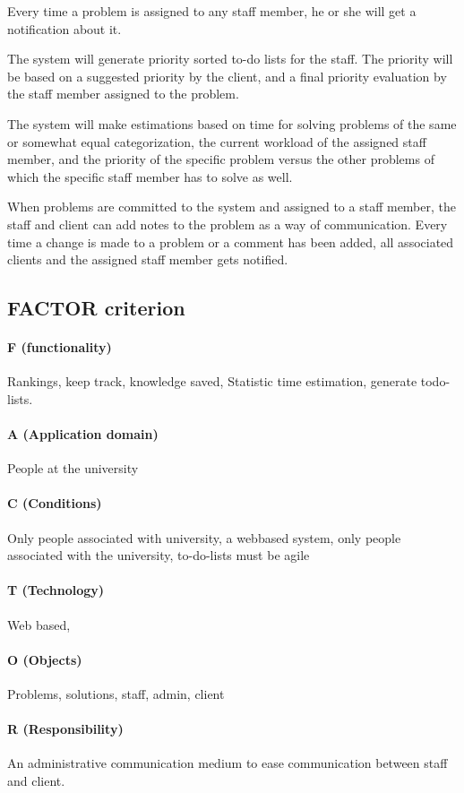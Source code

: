 Every time a problem is assigned to any staff member, he or she will get a notification about it.

The system will generate priority sorted to-do lists for the staff. The priority will be based on a suggested priority by the client, and a final priority evaluation by the staff member assigned to the problem.

The system will make estimations based on time for solving problems of the same or somewhat equal categorization, the current workload of the assigned staff member, and the priority of the specific problem versus the other problems of which the specific staff member has to solve as well. 

When problems are committed to the system and assigned to a staff member, the staff and client can add notes to the problem as a way of communication. Every time a change is made to a problem or a comment has been added, all associated clients and the assigned staff member gets notified.

\subsection{FACTOR criterion}
\label{sec:factor}


\paragraph{F (functionality)} Rankings, keep track, knowledge saved, Statistic time estimation, generate todo-lists.

\paragraph{A (Application domain)} People at the university

\paragraph{C (Conditions)} Only people associated with university, a webbased system, only people associated with the university, to-do-lists must be agile

\paragraph{T (Technology)} Web based, 

\paragraph{O (Objects)} Problems, solutions, staff, admin, client

\paragraph{R (Responsibility)} An administrative communication medium to ease communication between staff and client.\\